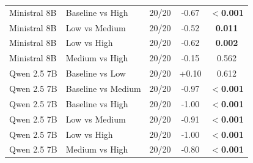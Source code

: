 \begin{table}[t]
\begin{tabular}{llccc}
    Ministral 8B & Baseline vs High & 20/20 & -0.67 & \textbf{$<$0.001} \\
    Ministral 8B & Low vs Medium & 20/20 & -0.52 & \textbf{0.011} \\
    Ministral 8B & Low vs High & 20/20 & -0.62 & \textbf{0.002} \\
    Ministral 8B & Medium vs High & 20/20 & -0.15 & 0.562 \\
    Qwen 2.5 7B & Baseline vs Low & 20/20 & +0.10 & 0.612 \\
    Qwen 2.5 7B & Baseline vs Medium & 20/20 & -0.97 & \textbf{$<$0.001} \\
    Qwen 2.5 7B & Baseline vs High & 20/20 & -1.00 & \textbf{$<$0.001} \\
    Qwen 2.5 7B & Low vs Medium & 20/20 & -0.91 & \textbf{$<$0.001} \\
    Qwen 2.5 7B & Low vs High & 20/20 & -1.00 & \textbf{$<$0.001} \\
    Qwen 2.5 7B & Medium vs High & 20/20 & -0.80 & \textbf{$<$0.001} \\
    \bottomrule
  \end{tabular}
\end{table}